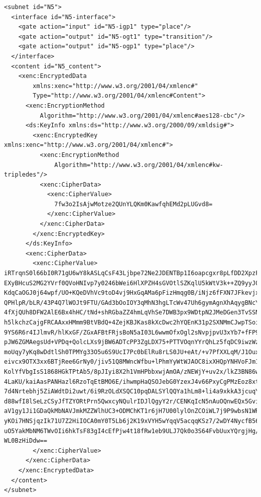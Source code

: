 \begin{lstlisting}
<subnet id="N5">
  <interface id="N5-interface">
    <gate action="input" id="N5-igp1" type="place"/>
    <gate action="output" id="N5-ogt1" type="transition"/>
    <gate action="output" id="N5-ogp1" type="place"/>
  </interface>
  <content id="N5_content">
    <xenc:EncryptedData 
        xmlns:xenc="http://www.w3.org/2001/04/xmlenc#" 
        Type="http://www.w3.org/2001/04/xmlenc#Content">
      <xenc:EncryptionMethod 
          Algorithm="http://www.w3.org/2001/04/xmlenc#aes128-cbc"/>
      <ds:KeyInfo xmlns:ds="http://www.w3.org/2000/09/xmldsig#">
        <xenc:EncryptedKey xmlns:xenc="http://www.w3.org/2001/04/xmlenc#">
          <xenc:EncryptionMethod 
              Algorithm="http://www.w3.org/2001/04/xmlenc#kw-tripledes"/>
          <xenc:CipherData>
            <xenc:CipherValue>
              7fw3o2IsAjwMotze2QUnYLQKm0KawfqhEMd2pLUGvd8=
            </xenc:CipherValue>
          </xenc:CipherData>
        </xenc:EncryptedKey>
      </ds:KeyInfo>
      <xenc:CipherData>
        <xenc:CipherValue>
iRTrqnS0l66bI0R71gU6wY8kASLqCsF43Ljbpe72Ne2JDENTBp1I6oapcgxr8pLfDD2XpzFKV9cE
EXyBHcuS2MG2YVrf0QVoHNIvp7y0246bWei6HlXPZH4sGVOtlSZKqlU5kWtV3k++ZQ9yyJ0F7pG1
KdqCaOGJ0j64wpf/UO+KQeDVhVc9toD4vj9HxGqAMa6pFizHmqg0B/iNjz6fFXN7JFkevjx6a/e8
QPHlpR/bLR/43P4Q7lWOJt9FTU/GAd3bOoIOY3qMhN3hgLTcWv47Uh6gymAgnXhAqygBNcYyHS79
4fXjQUh8DFW2AlE6Bx4hHC/tNd+shRGbaZZ4hmLqVhSe7DWB3px9WDtpN2JMeDGen3TvSSNPjAnk
h5lkchzCajgFRCAAxxHMmm9BtVBdQ+4ZejKBJKas8kXcDwc2hYQEnK31p2SXNMmCJwpTSoiNIR7s
9YS6R6r4IJlmvR/hlKxGF/ZGxAFBtFRjsBoN5aI03L6wwmOfxOgl2sNvpjpvU3xYb7+fFP9s1eJ5
pJW6ZGMAegsUd+VPDq+QolcLXs9jBW6ADTcPP3ZgLDX75+PTTVOqnYYrQhLz5fqDC9iwzWzI68bc
moUqy7yKq8wDdtlSh0TPMYg33O5u6S9UcI7Pc0bElRu8rLS0JU+eAt/+v7PfXXLqM/J1Oux9MGcJ
eivcx9OTX3xx6BTjRee6GrNy0/jiv51Q8MWncWfbu+lPhmYyWtWJAOC8ixXHQpYNHVoFJm1QOOaA
KolYfVbgIsS1868HGkTPtAb5/8pJIyi8X2h1VmHPbbxwjAmOA/zNEWjY+uv2x/lkZ3BN86wcsvW2
4LaKU/kaiAasPANHazl6RzoTqEtBMO6E/ihwmpHaQSOJebG0YzexJ4v66PxyCgPMzEoz8xtwQeQs
7d4Nrtebhj5ZiAWdtDi2uwt/6i9RzOLdXSQC10pqDALSYlQQYa1hLm8+li4a9xkkA3jcuqYXaIku
d88wfI8lSeLzCSyJfTZYORtPrn5QwxcyNQulrIDJlQgyY2r/CENKqIcN5nAuOQnwEQx5GvihSEEk
aV1gy1Ji1GDaQkMbNAVJmkMZZWlhUC3+ODMChKT1r6jH7U00lylOnZCOiWL7j9P9wbsN1WR+49CE
yKOi7HNSjqzIk71U7Z2HiIOCA0mY0T5Lb6j2K19xVYH5wYqqV5acqqKSz7/2wDY4NycfB56y2Uor
uO5YakMbNM6TWvOIi6hkTsF83gI4cEfPjw4t18fRw1eb9ULJ7Qk0o3S64FvbUuxYQrgjHg/MfM9d
WL0BzHiDdw==
        </xenc:CipherValue>
      </xenc:CipherData>
    </xenc:EncryptedData>
  </content>
</subnet>
\end{lstlisting}

